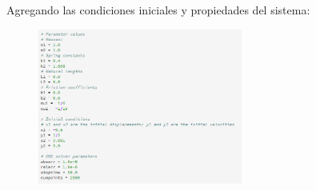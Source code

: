 \documentclass[a4paper]{article}
\begin{document}
\begin{center}
Agregando las condiciones iniciales y propiedades del sistema:
\begin{figure}[ht!]
 \centering
  \includegraphics[width=0.6\textwidth]{Codigo5_1.PNG}
\end{figure}


\end{center}
\end{document}
